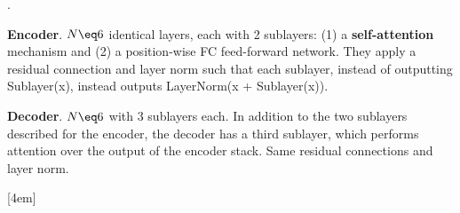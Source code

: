 \documentclass[11pt]{article}
\begin{document}
\myspace
\p {}. 
\begin{compactitem}
	\item \textbf{Encoder}. $N \eq 6$ identical layers, each with 2 sublayers: (1) a  \textbf{self-attention} mechanism and (2) a position-wise FC feed-forward network. They apply a residual connection and layer norm such that each sublayer, instead of outputting Sublayer(x), instead outputs LayerNorm(x + Sublayer(x)).
	
	\item \textbf{Decoder}. $N \eq 6$ with 3 sublayers each. In addition to the two sublayers described for the encoder, the decoder has a third sublayer, which performs  attention over the output of the encoder stack. Same residual connections and layer norm. 
\end{compactitem}[4em]
\end{document}
